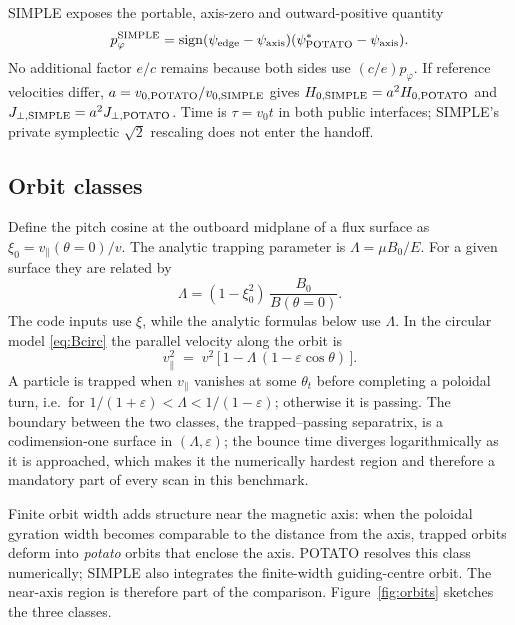 \documentclass[11pt,a4paper]{article}
\begin{document}
SIMPLE exposes the portable, axis-zero and outward-positive quantity
\begin{equation}
  p_\varphi^{\rm SIMPLE}
  = \operatorname{sign}(\psi_{\rm edge}-\psi_{\rm axis})
    (\psi^*_{\rm POTATO}-\psi_{\rm axis}).
\end{equation}
No additional factor $e/c$ remains because both sides use $(c/e)p_\varphi$.
If reference velocities differ, $a=v_{0,\rm POTATO}/v_{0,\rm SIMPLE}$ gives
$H_{0,\rm SIMPLE}=a^2H_{0,\rm POTATO}$ and
$J_{\perp,\rm SIMPLE}=a^2J_{\perp,\rm POTATO}$. Time is
$\tau=v_0t$ in both public interfaces; SIMPLE's private symplectic
$\sqrt{2}$ rescaling does not enter the handoff.

\subsection{Orbit classes}
\label{sec:classes}

Define the pitch cosine at the outboard midplane of a flux surface as
$\xi_0 = v_\parallel(\theta{=}0)/v$. The analytic trapping parameter is
$\Lambda = \mu B_0/E$. For a given surface they are related by
\begin{equation}
  \Lambda = (1-\xi_0^2)\,\frac{B_0}{B(\theta=0)}.
\end{equation}
The code inputs use $\xi$, while the analytic formulas below use $\Lambda$.
In the circular model \eqref{eq:Bcirc} the parallel velocity along the orbit is
\begin{equation}
  v_\parallel^2 \;=\; v^2\,\bigl[\,1 - \Lambda\,(1-\varepsilon\cos\theta)\,\bigr].
\end{equation}
A particle is trapped when $v_\parallel$ vanishes at some $\theta_t$ before
completing a poloidal turn, i.e.\ for
$1/(1+\varepsilon) < \Lambda < 1/(1-\varepsilon)$; otherwise it is passing.
The boundary between the two classes, the trapped--passing separatrix, is a
codimension-one surface in $(\Lambda,\varepsilon)$; the bounce time diverges
logarithmically as it is approached, which makes it the numerically hardest
region and therefore a mandatory part of every scan in this benchmark.

Finite orbit width adds structure near the magnetic axis: when the poloidal
gyration width becomes comparable to the distance from the axis, trapped
orbits deform into \emph{potato} orbits that enclose the axis. POTATO resolves
this class numerically; SIMPLE also integrates the finite-width guiding-centre
orbit. The near-axis region is therefore part of the comparison.
Figure~\ref{fig:orbits} sketches the three classes.
\end{document}
